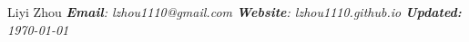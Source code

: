 \documentclass[letterpaper, 8pt]{article}
\begin{document}
{
\Huge{Liyi Zhou}
\hfill{\it\footnotesize \textbf{Email}: lzhou1110@gmail.com \textbf{Website}: lzhou1110.github.io \textbf{Updated:} \today}
}



\setlength{\tabcolsep}{10pt}
\end{document}
